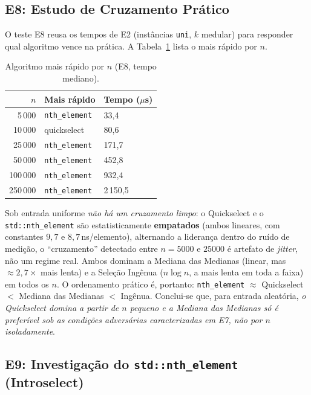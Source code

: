 \documentclass{infufrgs}
\begin{document}
\subsection{E8: Estudo de Cruzamento Prático}

O teste E8 reusa os tempos de E2 (instâncias \texttt{uni}, $k$ medular) para responder qual algoritmo vence na prática. A Tabela~\ref{tab:e8} lista o mais rápido por $n$.

\begin{table}[H]
\centering
\caption{Algoritmo mais rápido por $n$ (E8, tempo mediano).}
\label{tab:e8}
\begin{tabular}{rll}
\toprule
$n$ & Mais rápido & Tempo ($\mu$s) \\
\midrule
5\,000   & \texttt{nth\_element} & 33{,}4 \\
10\,000  & quickselect           & 80{,}6 \\
25\,000  & \texttt{nth\_element} & 171{,}7 \\
50\,000  & \texttt{nth\_element} & 452{,}8 \\
100\,000 & \texttt{nth\_element} & 932{,}4 \\
250\,000 & \texttt{nth\_element} & 2\,150{,}5 \\
\bottomrule
\end{tabular}
\end{table}

Sob entrada uniforme \emph{não há um cruzamento limpo}: o Quickselect e o \texttt{std::nth\_element} são estatisticamente \textbf{empatados} (ambos lineares, com constantes $9{,}7$ e $8{,}7$\,ns/elemento), alternando a liderança dentro do ruído de medição, o ``cruzamento'' detectado entre $n = 5000$ e $25000$ é artefato de \emph{jitter}, não um regime real. Ambos dominam a Mediana das Medianas (linear, mas $\approx 2{,}7\times$ mais lenta) e a Seleção Ingênua ($n\log n$, a mais lenta em toda a faixa) em todos os $n$. O ordenamento prático é, portanto: \texttt{nth\_element} $\approx$ Quickselect $<$ Mediana das Medianas $<$ Ingênua. Conclui-se que, para entrada aleatória, \emph{o Quickselect domina a partir de $n$ pequeno e a Mediana das Medianas só é preferível sob as condições adversárias caracterizadas em E7, não por $n$ isoladamente}.

\subsection{E9: Investigação do \texttt{std::nth\_element} (Introselect)}
\end{document}
